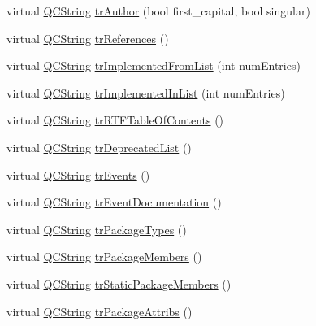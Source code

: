 \begin{DoxyCompactItemize}
\item 
virtual \mbox{\hyperlink{class_q_c_string}{Q\+C\+String}} \mbox{\hyperlink{class_translator_slovene_ac56b215affd0f9f24be416f0be413e6a}{tr\+Author}} (bool first\+\_\+capital, bool singular)
\item 
virtual \mbox{\hyperlink{class_q_c_string}{Q\+C\+String}} \mbox{\hyperlink{class_translator_slovene_a6abcfed8bae6a4625b22c022116d6e7b}{tr\+References}} ()
\item 
virtual \mbox{\hyperlink{class_q_c_string}{Q\+C\+String}} \mbox{\hyperlink{class_translator_slovene_a2dae700b74c58ab3a90307d16260c49e}{tr\+Implemented\+From\+List}} (int num\+Entries)
\item 
virtual \mbox{\hyperlink{class_q_c_string}{Q\+C\+String}} \mbox{\hyperlink{class_translator_slovene_aa7c820df57e5a0bc462144c45284375a}{tr\+Implemented\+In\+List}} (int num\+Entries)
\item 
virtual \mbox{\hyperlink{class_q_c_string}{Q\+C\+String}} \mbox{\hyperlink{class_translator_slovene_ab8ce806ff288264d1244f24ece1dff4d}{tr\+R\+T\+F\+Table\+Of\+Contents}} ()
\item 
virtual \mbox{\hyperlink{class_q_c_string}{Q\+C\+String}} \mbox{\hyperlink{class_translator_slovene_aa82c7b475e3a1ee9316a556fb4478ab3}{tr\+Deprecated\+List}} ()
\item 
virtual \mbox{\hyperlink{class_q_c_string}{Q\+C\+String}} \mbox{\hyperlink{class_translator_slovene_af55b066161283b049e039b03631b36d0}{tr\+Events}} ()
\item 
virtual \mbox{\hyperlink{class_q_c_string}{Q\+C\+String}} \mbox{\hyperlink{class_translator_slovene_ae2e0905cf87e6c623e6495a1e16018bb}{tr\+Event\+Documentation}} ()
\item 
virtual \mbox{\hyperlink{class_q_c_string}{Q\+C\+String}} \mbox{\hyperlink{class_translator_slovene_a5ed55e47bc0f2c335f63ece6267301b0}{tr\+Package\+Types}} ()
\item 
virtual \mbox{\hyperlink{class_q_c_string}{Q\+C\+String}} \mbox{\hyperlink{class_translator_slovene_a7254297c88f81c88303fb9976bd88f87}{tr\+Package\+Members}} ()
\item 
virtual \mbox{\hyperlink{class_q_c_string}{Q\+C\+String}} \mbox{\hyperlink{class_translator_slovene_a32d8258c4d2f48fbc8e65648f0c796f9}{tr\+Static\+Package\+Members}} ()
\item 
virtual \mbox{\hyperlink{class_q_c_string}{Q\+C\+String}} \mbox{\hyperlink{class_translator_slovene_a3243803d2a38ff05f0b82af0a7e734c7}{tr\+Package\+Attribs}} ()
\item 

\end{DoxyCompactItemize}

